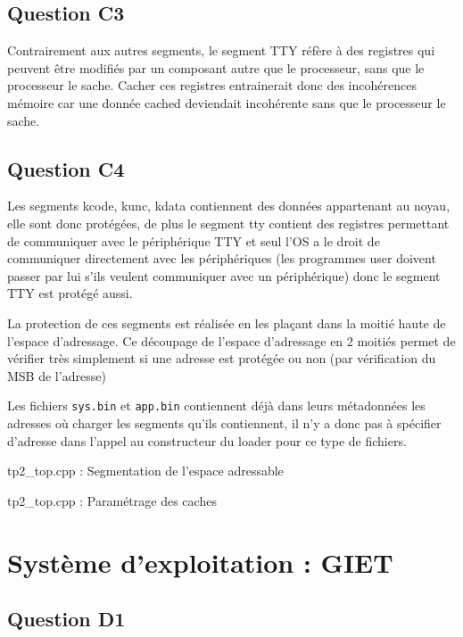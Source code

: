 \documentclass{article}
\begin{document}
\subsection{Question C3}

Contrairement aux autres segments, le segment TTY réfère à des registres qui
peuvent être modifiés par un composant autre que le processeur, sans que le
processeur le sache.
Cacher ces registres entrainerait donc des incohérences mémoire car une
donnée cached deviendait incohérente sans que le processeur le sache.

\subsection{Question C4}

Les segments kcode, kunc, kdata contiennent des données appartenant au noyau,
elle sont donc protégées, de plus le segment tty contient des registres
permettant de communiquer avec le périphérique TTY et seul l'OS a le droit de
communiquer directement avec les périphériques (les programmes user doivent
passer par lui s'ils veulent communiquer avec un périphérique) donc le segment
TTY est protégé aussi.

La protection de ces segments est réalisée en les plaçant dans la moitié haute
de l'espace d'adressage. Ce découpage de l'espace d'adressage en 2 moitiés
permet de vérifier très simplement si une adresse est protégée ou non
(par vérification du MSB de l'adresse)

Les fichiers \texttt{sys.bin} et \texttt{app.bin} contiennent déjà dans leurs
métadonnées les adresses où charger les segments qu'ils contiennent,
il n'y a donc pas à spécifier d'adresse dans l'appel au constructeur
du loader pour ce type de fichiers.

\newpage
tp2\_top.cpp : Segmentation de l'espace adressable


tp2\_top.cpp : Paramétrage des caches 


\section{Système d'exploitation : GIET}

\subsection{Question D1}
\end{document}
